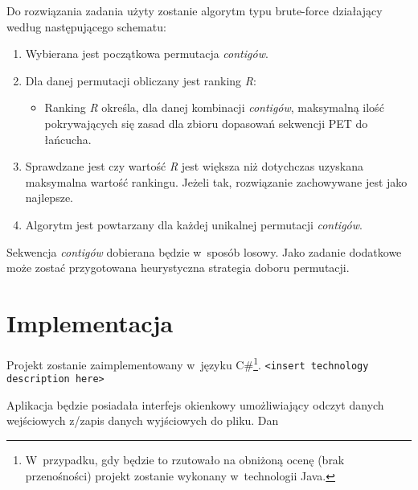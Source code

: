 \documentclass[a4paper,10pt]{article}
\begin{document}
Do rozwiązania zadania użyty zostanie algorytm typu brute-force działający według następującego schematu:

\begin{enumerate}
 \item Wybierana jest początkowa permutacja \emph{contigów}.
 \item Dla danej permutacji obliczany jest ranking \emph{R}:
   \begin{itemize}
    \item Ranking \emph{R} określa, dla danej kombinacji \emph{contigów}, maksymalną ilość pokrywających się zasad dla zbioru dopasowań sekwencji PET do łańcucha.
   \end{itemize}
 \item Sprawdzane jest czy wartość \emph{R} jest większa niż dotychczas uzyskana maksymalna wartość rankingu. Jeżeli tak, rozwiązanie zachowywane jest jako najlepsze.
 \item Algorytm jest powtarzany dla każdej unikalnej permutacji \emph{contigów}.
\end{enumerate}

Sekwencja \emph{contigów} dobierana będzie w~sposób losowy. Jako zadanie dodatkowe może zostać przygotowana heurystyczna strategia doboru permutacji.
 
\section*{Implementacja}

Projekt zostanie zaimplementowany w~języku C\#\footnote{W~przypadku, gdy będzie to rzutowało na obniżoną ocenę (brak przenośności) projekt zostanie wykonany w~technologii Java.}. \verb+<insert technology description here>+

Aplikacja będzie posiadała interfejs okienkowy umożliwiający odczyt danych wejściowych z/zapis danych wyjściowych do pliku. Dan
\end{document}
